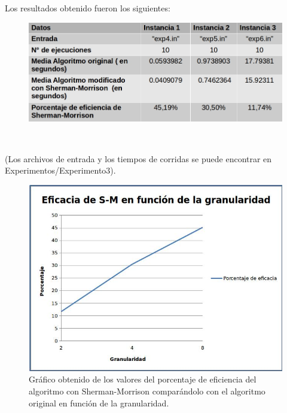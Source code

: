   Los resultados obtenido fueron los siguientes:
  
     \begin{figure}[H]
    \centering
    \includegraphics[scale=0.5]{graphs/grafico3.jpg}
    \end{figure}\
        
         (Los archivos de entrada y los tiempos de corridas se puede encontrar en Experimentos/Experimento3).


    \begin{figure}[H]
    \centering
    \includegraphics[scale=0.6]{graphs/graf.jpg}\caption{Gráfico obtenido de los valores del porcentaje de eficiencia del algoritmo con Sherman-Morrison comparándolo con el algoritmo original en función de la granularidad.}
    \end{figure}



